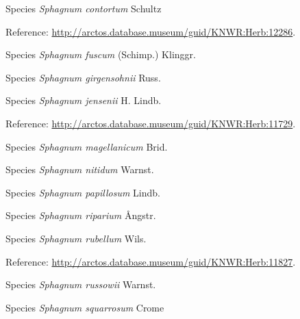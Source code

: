 \documentclass[9pt, article]{memoir}
\begin{document}
\begin{multicols}{2}
\vspace{6pt}\noindent\hspace{36pt}Species \textit{Sphagnum contortum} Schultz


\vspace{6pt}Reference: 
\url{http://arctos.database.museum/guid/KNWR:Herb:12286}.

\vspace{6pt}\noindent\hspace{36pt}Species \textit{Sphagnum fuscum} (Schimp.) Klinggr.


\vspace{6pt}\noindent\hspace{36pt}Species \textit{Sphagnum girgensohnii} Russ.


\vspace{6pt}\noindent\hspace{36pt}Species \textit{Sphagnum jensenii} H. Lindb.


\vspace{6pt}Reference: 
\url{http://arctos.database.museum/guid/KNWR:Herb:11729}.

\vspace{6pt}\noindent\hspace{36pt}Species \textit{Sphagnum magellanicum} Brid.


\vspace{6pt}\noindent\hspace{36pt}Species \textit{Sphagnum nitidum} Warnst.


\vspace{6pt}\noindent\hspace{36pt}Species \textit{Sphagnum papillosum} Lindb.


\vspace{6pt}\noindent\hspace{36pt}Species \textit{Sphagnum riparium} Ångstr.


\vspace{6pt}\noindent\hspace{36pt}Species \textit{Sphagnum rubellum} Wils.


\vspace{6pt}Reference: 
\url{http://arctos.database.museum/guid/KNWR:Herb:11827}.

\vspace{6pt}\noindent\hspace{36pt}Species \textit{Sphagnum russowii} Warnst.


\vspace{6pt}\noindent\hspace{36pt}Species \textit{Sphagnum squarrosum} Crome



\end{multicols}
\end{document}

